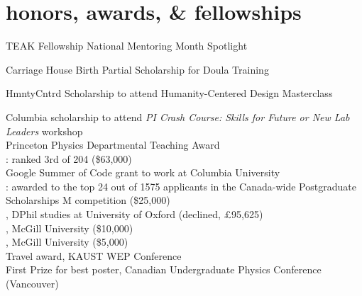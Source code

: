 \documentclass[4pt, letterpaper]{article}
\begin{document}
\section*{honors, awards, \& fellowships}
 TEAK Fellowship National Mentoring Month Spotlight

Carriage House Birth Partial Scholarship for Doula Training

HmntyCntrd Scholarship to attend Humanity-Centered Design Masterclass

Columbia scholarship to attend \emph{PI Crash Course: Skills for Future or New Lab Leaders} 
workshop\\
Princeton Physics Departmental Teaching Award\\
: ranked 3rd of 204 (\$63,000)\\
Google Summer of Code grant to work at Columbia University \\%
: awarded to the top 24 out of 1575 applicants in the Canada-wide Postgraduate Scholarships M competition (\$25,000)\\
, DPhil studies at University of Oxford (declined, £95,625)\\
, McGill University (\$10,000)\\
, McGill University (\$5,000)\\
Travel award, KAUST WEP Conference\\%
First Prize for best poster, {Canadian Undergraduate Physics Conference} (Vancouver)\\
\end{document}
